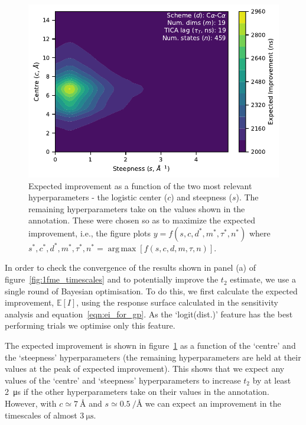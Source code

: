 \documentclass[journal=jacsat,manuscript=article]{achemso}
\DeclareMathOperator*{\argmax}{arg\,max}
\begin{document}
\begin{figure}
    \centering
    \includegraphics{figures/surface_distances_logistic_ei.pdf}
    \caption{Expected improvement as a function of the two most relevant hyperparameters - the logistic center ($c$) and steepness ($s$). The remaining hyperparameters take on the values shown in the annotation. These were chosen so as to maximize the expected improvement, i.e., the figure plots $y=f(s, c, d^{*}, m^{*}, \tau^{*}, n^{*})$ where $s^{*}, c^{*}, d^{*}, m^{*}, \tau^{*}, n^{*} = \argmax \left [f(s, c, d, m, \tau,n)\right]$. }
    \label{fig:ei_surface}
\end{figure}

In order to check the convergence of the results shown in panel (a) of figure~\ref{fig:1fme_timescales} and to potentially improve the $t_2$ estimate,  we use a single round of Bayesian optimisation. To do this, we first calculate the expected improvement, $\mathbb{E}[I]$,  using the response surface calculated in the sensitivity analysis and  equation~\ref{eqn:ei_for_gp}. As the `logit(dist.)' feature has the best performing trials we optimise only this feature. 


The expected improvement is shown in figure~\ref{fig:ei_surface} as a function of the `centre' and the `steepness' hyperparameters (the remaining hyperparameters are held at their values at the peak of expected improvement).  This shows that we expect any values of the `centre' and `steepness' hyperparameters to increase $t_2$ by at least \SI{2}{\micro\second} if the other hyperparameters take on their values in the annotation. However, with $c\simeq \SI{7}{\angstrom}$ and $s\simeq \SI{0.5}{\per\angstrom}$ we can expect an improvement in the timescales of almost $\SI{3}{\micro\second}$. 
\end{document}
